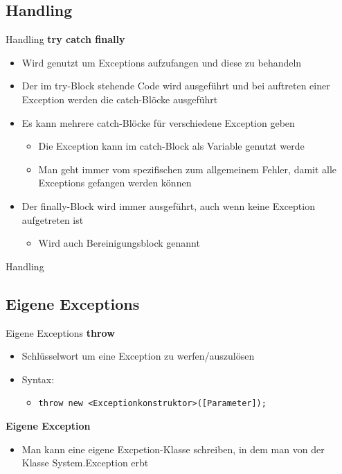 \subsection{Handling}
\begin{frame}{Handling}
	\textbf{try catch finally}\\
	\begin{itemize}
		\item Wird genutzt um Exceptions aufzufangen und diese zu behandeln
		\item Der im \alert{try}-Block stehende Code wird ausgeführt und bei auftreten einer Exception werden die \alert{catch}-Blöcke ausgeführt
		\item Es kann mehrere \alert{catch}-Blöcke für verschiedene Exception geben
		\begin{itemize}
			\item Die Exception kann im \alert{catch}-Block als Variable genutzt werde
			\item Man geht immer vom spezifischen zum allgemeinem Fehler, damit alle Exceptions gefangen werden können
		\end{itemize}
		\item Der \alert{finally}-Block wird immer ausgeführt, auch wenn keine Exception aufgetreten ist
		\begin{itemize}
			\item Wird auch Bereinigungsblock genannt
		\end{itemize}
	\end{itemize}
\end{frame}

\begin{frame}{Handling}
		
\end{frame}

\subsection{Eigene Exceptions}
\begin{frame}{Eigene Exceptions}
	\textbf{throw}\\
	\begin{itemize}
		\item Schlüsselwort um eine Exception zu werfen/auszulösen
		\item Syntax:
		\begin{itemize}
			\item \texttt{throw new \alert{<Exceptionkonstruktor>}(\alert{[Parameter]});}
		\end{itemize}
	\end{itemize}
	\textbf{Eigene Exception}\\
	\begin{itemize}
		\item Man kann eine eigene Excpetion-Klasse schreiben, in dem man von der Klasse \alert{System.Exception} erbt
	\end{itemize}
\end{frame}

